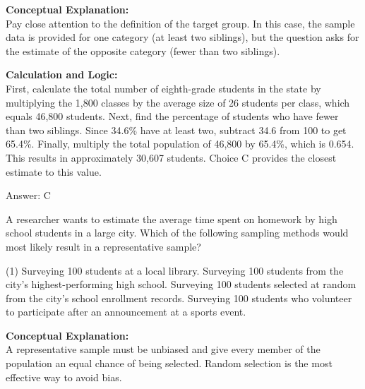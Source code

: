 \documentclass[11pt,paper=a4,answers]{exam}
\begin{document}
\begin{questions}
\begin{solution}
\textbf{Conceptual Explanation:} \\
Pay close attention to the definition of the target group. In this case, the sample data is provided for one category (at least two siblings), but the question asks for the estimate of the opposite category (fewer than two siblings).

\vspace{30pt}

\textbf{Calculation and Logic:} \\
First, calculate the total number of eighth-grade students in the state by multiplying the 1,800 classes by the average size of 26 students per class, which equals 46,800 students. Next, find the percentage of students who have fewer than two siblings. Since 34.6\% have at least two, subtract 34.6 from 100 to get 65.4\%. Finally, multiply the total population of 46,800 by 65.4\%, which is 0.654. This results in approximately 30,607 students. Choice C provides the closest estimate to this value.

\vspace{30pt}

Answer: \colorbox{yellow!100}{C}
\end{solution}

\vspace{60pt}

\question
A researcher wants to estimate the average time spent on homework by high school students in a large city. Which of the following sampling methods would most likely result in a representative sample?
\begin{tasks}(1)
    \task Surveying 100 students at a local library.
    \task Surveying 100 students from the city's highest-performing high school.
    \task Surveying 100 students selected at random from the city's school enrollment records.
    \task Surveying 100 students who volunteer to participate after an announcement at a sports event.
\end{tasks}

\begin{solution}
\textbf{Conceptual Explanation:} \\
A representative sample must be unbiased and give every member of the population an equal chance of being selected. Random selection is the most effective way to avoid bias.

\vspace{30pt}


\end{solution}
\end{questions}
\end{document}
